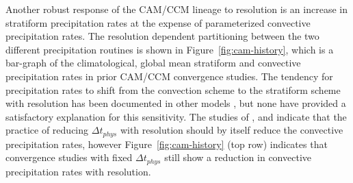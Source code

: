 \documentclass[times]{qjrms4}
\begin{document}
Another robust response of the CAM/CCM lineage to resolution is an increase in stratiform precipitation rates at the expense of parameterized convective precipitation rates. The resolution dependent partitioning between the two different precipitation routines is shown in Figure~\ref{fig:cam-history}, which is a bar-graph of the climatological, global mean stratiform and convective precipitation rates in prior CAM/CCM convergence studies. The tendency for precipitation rates to shift from the convection scheme to the stratiform scheme with resolution has been documented in other models \citep{PS2002CD,RETAL2016CD,TETAL2018CD}, but none have provided a satisfactory explanation for this sensitivity. The studies of \cite{KW1991JGR}, \cite{WETAL1995CD} and \cite{W2013QJRMS} indicate that the practice of reducing $\Delta t_{phys}$ with resolution should by itself reduce the convective precipitation rates, however Figure~\ref{fig:cam-history} (top row) indicates that convergence studies with fixed $\Delta t_{phys}$ still show a reduction in convective precipitation rates with resolution.
\end{document}
